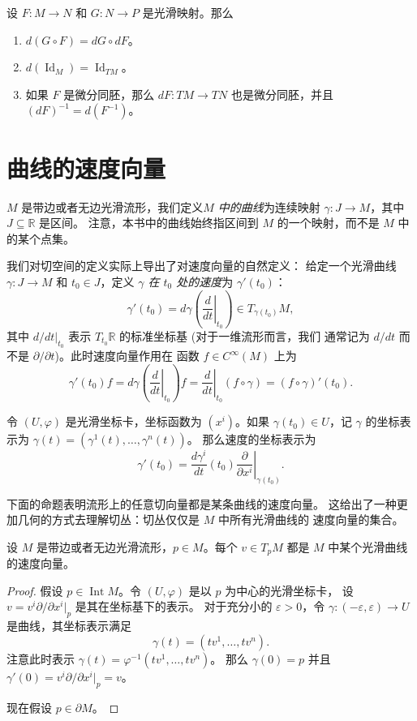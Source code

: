 \documentclass[fontset=none]{Notes}
\DeclareMathOperator\Int{Int}
\DeclareMathOperator\Id{Id}
\begin{document}
\begin{corollary}[全局微分的性质]
  设 $F:M\to N$ 和 $G:N\to P$ 是光滑映射。那么
  \begin{enumerate}
    \item $d(G\circ F)=dG\circ dF$。
    \item $d(\Id_M)=\Id_{TM}$。
    \item 如果 $F$ 是微分同胚，那么 $dF:TM\to TN$ 也是微分同胚，并且
    $(dF)^{-1}=d(F^{-1})$。
  \end{enumerate}
\end{corollary}

\section{曲线的速度向量}

$M$ 是带边或者无边光滑流形，我们定义\emph{$M$ 中的曲线}为连续映射
$\gamma:J\to M$，其中 $J\subseteq\mathbb{R}$ 是区间。
注意，本书中的曲线始终指区间到 $M$ 的一个映射，而不是 $M$ 中的某个点集。

我们对切空间的定义实际上导出了对速度向量的自然定义：
给定一个光滑曲线 $\gamma:J\to M$ 和 $t_0\in J$，定义
\emph{$\gamma$ 在 $t_0$ 处的速度}为 $\gamma'(t_0)$：
\[
  \gamma'(t_0)=d\gamma\left(\left.\frac{d}{dt}\right|_{t_0}\right)
  \in T_{\gamma(t_0)}M,
\]
其中 $d/dt|_{t_0}$ 表示 $T_{t_0}\mathbb{R}$ 的标准坐标基 (对于一维流形而言，我们
通常记为 $d/dt$ 而不是 $\partial/\partial t$)。此时速度向量作用在
函数 $f\in C^\infty(M)$ 上为
\[
  \gamma'(t_0)f=  d\gamma\left(\left.\frac{d}{dt}\right|_{t_0}\right)f
  =\left.\frac{d}{dt}\right|_{t_0}(f\circ\gamma)=
  (f\circ\gamma)'(t_0).
\]

令 $(U,\varphi)$ 是光滑坐标卡，坐标函数为 $\left(x^i\right)$。如果
$\gamma(t_0)\in U$，记 $\gamma$ 的坐标表示为 $\gamma(t)=\left(\gamma^1(t),\dots,\gamma^n(t)\right)$。
那么速度的坐标表示为
\[
  \gamma'(t_0)=\frac{d\gamma^i}{dt}(t_0)\left.\frac{\partial}{\partial x^i}\right|_{\gamma(t_0)}.
\]

下面的命题表明流形上的任意切向量都是某条曲线的速度向量。
这给出了一种更加几何的方式去理解切丛：切丛仅仅是 $M$ 中所有光滑曲线的
速度向量的集合。

\begin{proposition}\label{prop:velocity}
  设 $M$ 是带边或者无边光滑流形，$p\in M$。每个 $v\in T_pM$
  都是 $M$ 中某个光滑曲线的速度向量。
\end{proposition}
\begin{proof}
  假设 $p\in \Int M$。令 $(U,\varphi)$ 是以 $p$ 为中心的光滑坐标卡，
  设 $v=v^i\partial/\partial x^i|_p$ 是其在坐标基下的表示。
  对于充分小的 $\varepsilon>0$，令 $\gamma:(-\varepsilon,\varepsilon)\to U$
  是曲线，其坐标表示满足
  \[
    \gamma(t)=\left(tv^1,\dots,tv^n\right).
  \]
  注意此时表示 $\gamma(t)=\varphi^{-1}\left(tv^1,\dots,tv^n\right)$。
  那么 $\gamma(0)=p$ 并且 $\gamma'(0)=v^i\partial/\partial x^i|_p=v$。

  现在假设 $p\in\partial M$。
\end{proof}
\end{document}
